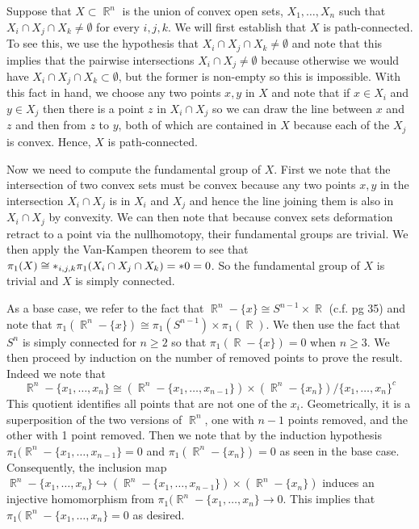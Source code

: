 \documentclass{article}
\DeclareMathOperator{\R}{\mathbb{R}}
\DeclareMathOperator{\into}{\hookrightarrow}
\newcommand{\exercise}[1]{\noindent{\textbf{Exercise #1:}}}
\begin{document}
\exercise{1.2.2}

Suppose that $X \subset \R^n$ is the union of convex open sets,
$X_1,\ldots,X_n$ such that $X_i \cap X_j\cap X_k \neq \emptyset$ for
every $i,j,k$. We will first establish that $X$ is path-connected. To
see this, we use the hypothesis that $X_i \cap X_j\cap X_k \neq
\emptyset$ and note that this implies that the pairwise intersections
$X_i\cap X_j \neq \emptyset$ because otherwise we would have $X_i \cap
X_j\cap X_k \subset \emptyset$, but the former is non-empty so this is
impossible. With this fact in hand, we choose any two points $x,y$ in
$X$ and note that if $x \in X_i$ and $y \in X_j$ then there is a point
$z$ in $X_i \cap X_j$ so we can draw the line between $x$ and $z$ and
then from $z$ to $y$, both of which are contained in $X$ because each
of the $X_j$ is convex. Hence, $X$ is path-connected.

Now we need to compute the fundamental group of $X$. First we note
that the intersection of two convex sets must be convex because any
two points $x,y$ in the intersection $X_i \cap X_j$ is in $X_i$ and
$X_j$ and hence the line joining them is also in $X_i\cap X_j$ by
convexity. We can then note that because convex sets deformation
retract to a point via the nullhomotopy, their fundamental groups are
trivial. We then apply the Van-Kampen theorem to see that $\pi_1(X)
\cong \mathlarger{\ast}_{i,j,k} \pi_1(X_i \cap X_j \cap X_k) = \ast 0
= 0$. So the fundamental group of $X$ is trivial and $X$ is simply
connected.

\exercise{1.2.3}

As a base case, we refer to the fact that $\R^n - \{x\} \cong S^{n-1}
\times \R$ (c.f. pg 35) and note that $\pi_1(\R^n - \{x\}) \cong
\pi_1(S^{n-1}) \times \pi_1(\R)$. We then use the fact that $S^n$ is
simply connected for $n \geq 2$ so that $\pi_1(\R - \{x\}) = 0$ when
$n \geq 3$. We then proceed by induction on the number of removed
points to prove the result. Indeed we note that
\[
\R^n - \{x_1, \ldots, x_n\} \cong (\R^n - \{x_1,\ldots,x_{n-1}\})
\times (\R^n - \{x_n\})/\{x_1,\ldots,x_n\}^c
\]
This quotient identifies all points that are not one of the
$x_i$. Geometrically, it is a superposition of the two versions of
$\R^n$, one with $n-1$ points removed, and the other with 1 point
removed. Then we note that by the induction hypothesis $\pi_1(\R^n -
\{x_1,\ldots,x_{n-1}\} = 0$ and $\pi_1(\R^n - \{x_n\}) = 0$ as seen in
the base case. Consequently, the inclusion map $\R^n -
\{x_1,\ldots,x_n\} \into (\R^n - \{x_1,\ldots,x_{n-1}\}) \times (\R^n
- \{x_n\})$ induces an injective homomorphism from $\pi_1(\R^n -
\{x_1,\ldots,x_n\} \to 0$. This implies that $\pi_1(\R^n -
\{x_1,\ldots,x_n\} = 0$ as desired.
\end{document}
